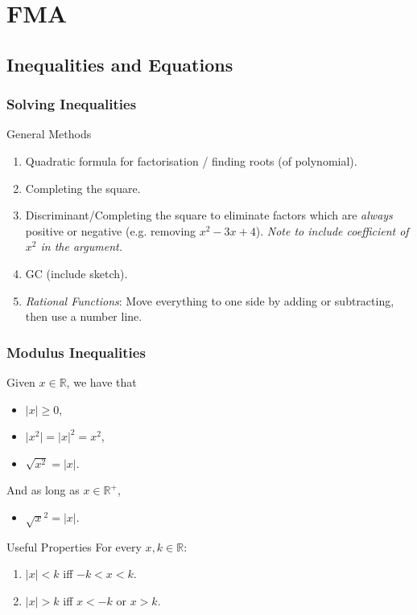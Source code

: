 \documentclass[oneside]{book}
\begin{document}

\part{FMA}
\chapter{Inequalities and Equations}
\section{Solving Inequalities}
\begin{stbox}{General Methods}
  \begin{enumerate}
    \item Quadratic formula for factorisation / finding roots (of polynomial).
    \item Completing the square.
    \item Discriminant/Completing the square to eliminate factors which are \emph{always} positive or negative (e.g. removing \(x^2-3x+4\)). \emph{Note to include coefficient of \(x^2\) in the argument.}
    \item GC (include sketch).
    \item \emph{Rational Functions}: Move everything to one side by adding or subtracting, then use a number line.
\end{enumerate}
\end{stbox}
\section{Modulus Inequalities}
\begin{fact}
    Given \(x \in \mathbb{R}\), we have that 
    \begin{itemize}
        \item \(\lvert x \rvert \geq 0\),
        \item \(\lvert x^2 \rvert=\lvert x \rvert^2=x^2\),
        \item \(\sqrt{x^2}=\lvert x \rvert\).
    \end{itemize}
    And as long as \(x \in \mathbb{R}^+\),
    \begin{itemize}
        \item \(\sqrt{x}^2=\lvert x \rvert\).
    \end{itemize}
\end{fact}
\begin{stbox}{Useful Properties}
  For every \(x,k \in \mathbb{R}\):
  \begin{enumerate}[label=(\alph*)]
      \item \(\lvert x \rvert < k\) iff \(-k<x<k\).
      \item \(\lvert x \rvert > k\) iff \(x<-k\) or \(x>k\).
  \end{enumerate}
\end{stbox}
\end{document}
